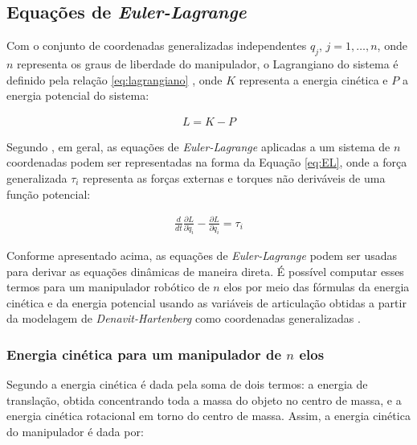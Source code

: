 \subsection{Equações de \textit{Euler-Lagrange}}
\label{EL}

Com o conjunto de coordenadas generalizadas independentes $q_j$, $j = 1, \dotsc, n$, onde $n$ 
representa os graus de liberdade do manipulador, o Lagrangiano do sistema 
é definido pela relação \eqref{eq:lagrangiano} \cite{Spong}, onde $K$ representa 
a energia cinética e $P$ a energia potencial do sistema:

\begin{equation}
  \begin{gathered}
    L = K - P
  \end{gathered}
  \label{eq:lagrangiano}
\end{equation}

Segundo , em geral, as equações de \textit{Euler-Lagrange}
aplicadas a um sistema de $n$ coordenadas podem ser representadas na forma da
Equação \eqref{eq:EL}, onde a força generalizada $\tau_i$ representa as forças 
externas e torques não deriváveis de uma função potencial:

\begin{equation}
  \begin{gathered}
    \frac{d}{dt}\frac{\partial L}{\partial \dot q_i}-\frac{\partial L}{\partial q_i} = \tau_i
  \end{gathered}
  \label{eq:EL}
\end{equation}

Conforme apresentado acima, as equações de \textit{Euler-Lagrange} podem ser 
usadas para derivar as equações dinâmicas de maneira direta. É possível computar 
esses termos para um manipulador robótico de $n$ elos por meio das fórmulas da 
energia cinética e da energia potencial usando as variáveis de articulação obtidas a partir da modelagem 
de \textit{Denavit-Hartenberg} como coordenadas generalizadas \cite{Spong}.

\subsubsection{Energia cinética para um manipulador de $n$ elos}

Segundo  a energia cinética é dada pela soma de dois 
termos: a energia de translação, obtida concentrando toda a massa do objeto no 
centro de massa, e a energia cinética rotacional em torno do centro de massa. 
Assim, a energia cinética do manipulador é dada por:

